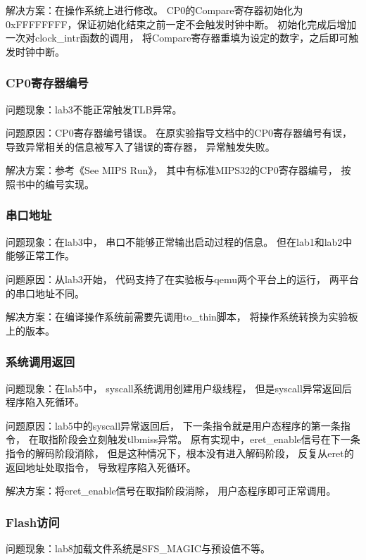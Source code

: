             解决方案：在操作系统上进行修改。%
            CP0的Compare寄存器初始化为0xFFFFFFFF，保证初始化结束之前一定不会触发时钟中断。%
            初始化完成后增加一次对clock\_intr函数的调用，%
            将Compare寄存器重填为设定的数字，之后即可触发时钟中断。

        \subsubsection{CP0寄存器编号}
            问题现象：lab3不能正常触发TLB异常。

            问题原因：CP0寄存器编号错误。%
            在原实验指导文档中的CP0寄存器编号有误，%
            导致异常相关的信息被写入了错误的寄存器，%
            异常触发失败。%

            解决方案：参考《See MIPS Run》，%
            其中有标准MIPS32的CP0寄存器编号，%
            按照书中的编号实现。

        \subsubsection{串口地址}
            问题现象：在lab3中，%
            串口不能够正常输出启动过程的信息。%
            但在lab1和lab2中能够正常工作。

            问题原因：从lab3开始，%
            代码支持了在实验板与qemu两个平台上的运行，%
            两平台的串口地址不同。

            解决方案：在编译操作系统前需要先调用to\_thin脚本，%
            将操作系统转换为实验板上的版本。

        \subsubsection{系统调用返回}
            问题现象：在lab5中，%
            syscall系统调用创建用户级线程，%
            但是syscall异常返回后程序陷入死循环。

            问题原因：lab5中的syscall异常返回后，%
            下一条指令就是用户态程序的第一条指令，%
            在取指阶段会立刻触发tlbmiss异常。%
            原有实现中，eret\_enable信号在下一条指令的解码阶段消除，%
            但是这种情况下，根本没有进入解码阶段，%
            反复从eret的返回地址处取指令，%
            导致程序陷入死循环。

            解决方案：将eret\_enable信号在取指阶段消除，%
            用户态程序即可正常调用。
            
        \subsubsection{Flash访问}
            问题现象：lab8加载文件系统是SFS\_MAGIC与预设值不等。

